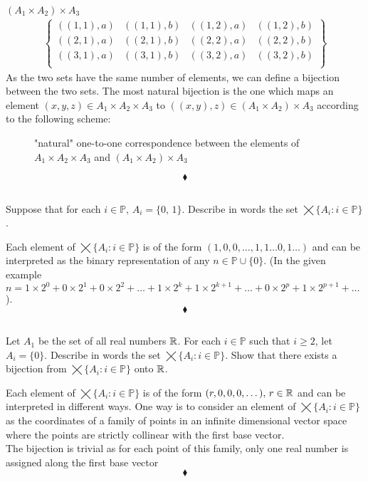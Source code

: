 $\left(A_1 \times A_2\right)\times A_3$\\
\begin{align*}
\left\{\begin{matrix}
\left((1, 1), a\right)&\left((1, 1), b\right)&\left((1, 2), a\right)&\left((1, 2), b\right)\\
\left((2, 1), a\right)&\left((2, 1), b\right)&\left((2, 2), a\right)&\left((2, 2), b\right)\\
\left((3, 1), a\right)&\left((3, 1), b\right)&\left((3, 2), a\right)&\left((3, 2), b\right)\\
\end{matrix}
\right\}
\end{align*}
As the two sets have the same number of elements, we can define a bijection between the two sets. The most natural bijection is the one which maps an element $(x,y,z)\in A_1 \times A_2\times A_3$ to $\left((x,y),z\right)\in \left(A_1 \times A_2\right)\times A_3$ according to the following scheme:
\begin{figure}[H]%
    \centering
    
\caption{"natural" one-to-one correspondence between the elements of $A_1 \times A_2\times A_3$ and $(A_1\times A_2) \times A_3$}
\label{fig:fig_p8b}
\end{figure}
$$\blacklozenge$$

\subsection{}
\begin{tcolorbox}
Suppose that for each $i \in  \mathbb{P},\, A_i = \{0, \,1\}$. Describe in words the set $\bigtimes\{A_i:i \in \mathbb{P}\}$.
\end{tcolorbox}
$$ $$
Each element of $\bigtimes\{A_i:i \in \mathbb{P}\}$ is of the form $(1,0,0,\dots, 1,1\dots 0,1\dots)$ and can be interpreted as the binary representation of any $n\in \mathbb{P}\cup\{0\}$. (In the given example $n= 1\times 2^0+0\times 2^1+0\times 2^2+\dots+ 1\times 2^k +1\times 2^{k+1}+\dots + 0\times 2^p + 1\times 2^{p+1}+\dots$).
$$\blacklozenge$$

\subsection{}
\begin{tcolorbox}
Let $A_1$ be the set of all real numbers $\mathbb{R}$. For each $i \in \mathbb{P}$ such that $i \ge 2$, let $A_i=\{0\}$. Describe in words the set $\bigtimes \{A_i: i \in \mathbb{P}\}$. Show that there exists a bijection from $\bigtimes \{A_i: i \in \mathbb{P}\}$ onto $\mathbb{R}$.
\end{tcolorbox}
$$ $$
Each element of $\bigtimes\{A_i:i \in \mathbb{P}\}$ is of the form $(r,0,0,0,\dots),\, r\in \mathbb{R}$ and can be interpreted in different ways. One way is to consider an element of $\bigtimes\{A_i:i \in \mathbb{P}\}$ as the coordinates of a family of points in an infinite dimensional vector space where the points are strictly collinear with the first base vector.\\
The bijection is trivial as for each point of this family, only one real number is assigned along the first base vector
$$\blacklozenge$$

